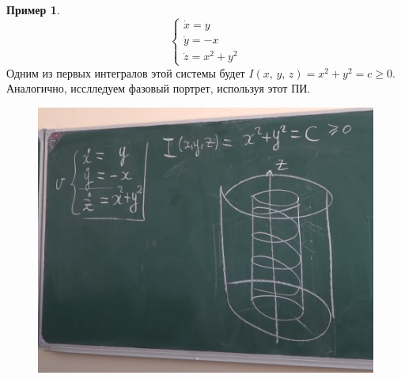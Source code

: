 \documentclass[a4paper,12pt]{article}
\renewcommand{\geq}{\ensuremath{\geqslant}}
\theoremstyle{plain}
\theoremstyle{definition}
\newtheorem*{example}{Пример}
\theoremstyle{remark}
\begin{document}
\newpage
\begin{example}
	\[
		\begin{cases}
			\dot{x} = y  \\
			\dot{y} = -x \\
			\dot{z} = x^2 + y^2
		\end{cases}
	\]
	Одним из первых интегралов этой системы будет $I(x,\,y,\,z) = x^2 + y^2 = c \geq 0$. Аналогично, исслледуем фазовый портрет, используя этот ПИ.
	\begin{figure}[h]
		\includegraphics[scale=0.7]{img/paral_rusalli.png}
	\end{figure}
\end{example}
\end{document}

